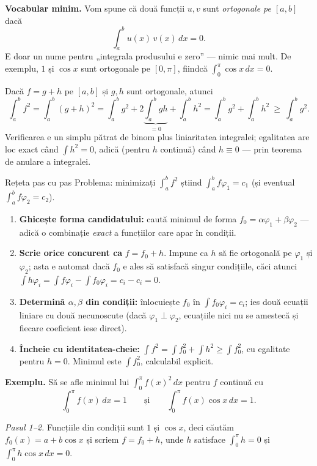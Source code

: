 \textbf{Vocabular minim.} Vom spune că două funcții $u,v$ sunt \emph{ortogonale pe $[a,b]$} dacă
\[
\int_a^b u(x)\,v(x)\,dx=0.
\]
E doar un nume pentru „integrala produsului e zero'' --- nimic mai mult. De exemplu, $1$ și $\cos x$ sunt ortogonale pe $[0,\pi]$, fiindcă $\int_0^\pi\cos x\,dx=0$.

\begin{teorema}
Dacă $f=g+h$ pe $[a,b]$ și $g,h$ sunt ortogonale, atunci
\[
\int_a^b f^2=\int_a^b(g+h)^2=\int_a^b g^2+2\underbrace{\int_a^b gh}_{=0}+\int_a^b h^2
=\int_a^b g^2+\int_a^b h^2\ \ge\ \int_a^b g^2.
\]
Verificarea e un simplu pătrat de binom plus liniaritatea integralei; egalitatea are loc exact când $\int h^2=0$, adică (pentru $h$ continuă) când $h\equiv0$ --- prin teorema de anulare a integralei.
\end{teorema}

\begin{tehbox}{Rețeta pas cu pas}
Problema: minimizați $\int_a^b f^2$ știind $\int_a^b f\varphi_1=c_1$ (și eventual $\int_a^b f\varphi_2=c_2$).
\begin{enumerate}[leftmargin=*, itemsep=1pt]
\item \textbf{Ghicește forma candidatului:} caută minimul de forma $f_0=\alpha\varphi_1+\beta\varphi_2$ --- adică o combinație \emph{exact} a funcțiilor care apar în condiții.
\item \textbf{Scrie orice concurent ca} $f=f_0+h$. Impune ca $h$ să fie ortogonală pe $\varphi_1$ și $\varphi_2$; asta e automat dacă $f_0$ e ales să satisfacă singur condițiile, căci atunci $\int h\varphi_i=\int f\varphi_i-\int f_0\varphi_i=c_i-c_i=0$.
\item \textbf{Determină $\alpha,\beta$ din condiții:} înlocuiește $f_0$ în $\int f_0\varphi_i=c_i$; ies două ecuații liniare cu două necunoscute (dacă $\varphi_1\perp\varphi_2$, ecuațiile nici nu se amestecă și fiecare coeficient iese direct).
\item \textbf{Încheie cu identitatea-cheie:} $\int f^2=\int f_0^2+\int h^2\ge\int f_0^2$, cu egalitate pentru $h=0$. Minimul este $\int f_0^2$, calculabil explicit.
\end{enumerate}
\end{tehbox}

\textbf{Exemplu.} Să se afle minimul lui $\int_0^{\pi}f(x)^2\,dx$ pentru $f$ continuă cu
\[
\int_0^\pi f(x)\,dx=1
\qquad\text{și}\qquad
\int_0^\pi f(x)\cos x\,dx=1.
\]

\emph{Pasul 1--2.} Funcțiile din condiții sunt $1$ și $\cos x$, deci căutăm $f_0(x)=a+b\cos x$ și scriem $f=f_0+h$, unde $h$ satisface $\int_0^\pi h=0$ și $\int_0^\pi h\cos x\,dx=0$.

